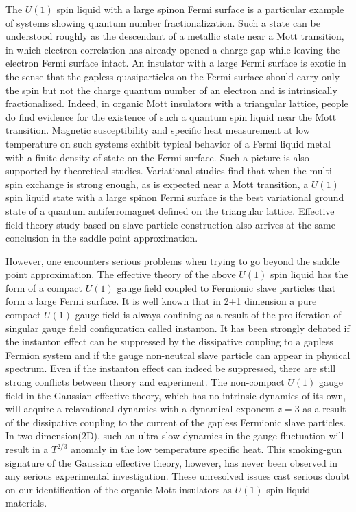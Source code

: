 \documentclass[12pt]{article}
\begin{document}
The $U(1)$ spin liquid with a large spinon Fermi surface is a particular example of systems showing quantum number fractionalization.  Such a state can be understood roughly as the descendant of a metallic state near a Mott transition, in which electron correlation has already opened a charge gap while leaving the electron Fermi surface intact. An insulator with a large Fermi surface is exotic in the sense that the gapless quasiparticles on the Fermi surface should carry only the spin but not the charge quantum number of an electron and is intrinsically fractionalized. Indeed, in organic Mott insulators with a triangular lattice, people do find evidence for the existence of such a quantum spin liquid near the Mott transition\cite{Kanoda1,Kanoda2,Matsuda,Zhou}. Magnetic susceptibility and specific heat measurement at low temperature on such systems exhibit typical behavior of a Fermi liquid metal with a finite density of state on the Fermi surface. Such a picture is also supported by theoretical studies. Variational studies find that when the multi-spin exchange is strong enough, as is expected near a Mott transition, a $U(1)$ spin liquid state with a large spinon Fermi surface is the best variational ground state of a quantum antiferromagnet defined on the triangular lattice\cite{Motrunich}. Effective field theory study based on slave particle construction also arrives at the same conclusion in the saddle point approximation\cite{SSLee1}. 

However, one encounters serious problems when trying to go beyond the saddle point approximation. The effective theory of the above $U(1)$ spin liquid has the form of a compact $U(1)$ gauge field coupled to Fermionic slave particles that form a large Fermi surface\cite{Zhou}. It is well known that in 2+1 dimension a pure compact $U(1)$ gauge field is always confining as a result of the proliferation of singular gauge field configuration called instanton\cite{Ployakov}. It has been strongly debated if the instanton effect can be suppressed by the dissipative coupling to a gapless Fermion system and if the gauge non-neutral slave particle can appear in physical spectrum\cite{PALee2,Millis,Polchinski,PALee3,Nayak,Wen1,Herbut1,Herbut2,Hermele,SSLee2,Sachdev1,Senthil1}. Even if the instanton effect can indeed be suppressed, there are still strong conflicts between theory and experiment. The non-compact $U(1)$ gauge field in the Gaussian effective theory, which has no intrinsic dynamics of its own, will acquire a relaxational dynamics with a dynamical exponent $z=3$ as a result of the dissipative coupling to the current of the gapless Fermionic slave particles\cite{Reizer,PALee2}. In two dimension(2D), such an ultra-slow dynamics in the gauge fluctuation will result in a $T^{2/3}$ anomaly in the low temperature specific heat\cite{Wong}. This smoking-gun signature of the Gaussian effective theory, however, has never been observed in any serious experimental investigation\cite{Zhou}. These unresolved issues cast serious doubt on our identification of the organic Mott insulators as $U(1)$ spin liquid materials\cite{Senthil2,Grover,Sachdev2,Yao,Xu}.  
\end{document}

